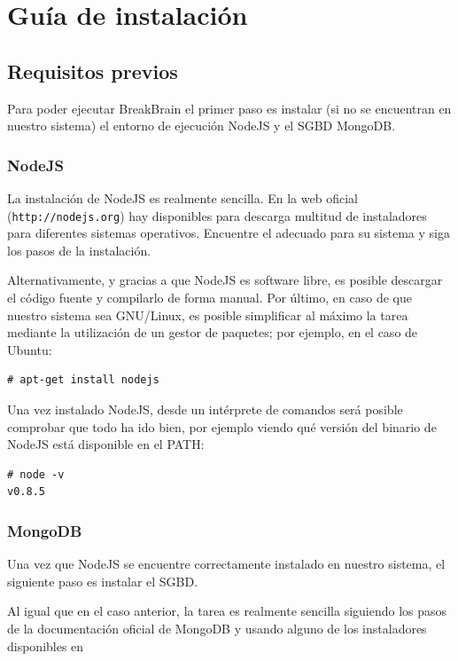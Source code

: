 \chapter{Guía de instalación}
\label{chap::instalacion}

\section{Requisitos previos}

Para poder ejecutar BreakBrain el primer paso es instalar (si no se encuentran en nuestro sistema) el entorno de ejecución NodeJS y el \acf{SGBD} MongoDB.

\subsection{NodeJS}

La instalación de NodeJS es realmente sencilla. En la web oficial ({\tt http://nodejs.org}) hay disponibles para descarga multitud de instaladores para diferentes sistemas operativos. Encuentre el adecuado para su sistema y siga los pasos de la instalación.

Alternativamente, y gracias a que NodeJS es software libre, es posible descargar el código fuente y compilarlo de forma manual. Por último, en caso de que nuestro sistema sea GNU/Linux, es posible simplificar al máximo la tarea mediante la utilización de un gestor de paquetes; por ejemplo, en el caso de Ubuntu:

\begin{verbatim}
# apt-get install nodejs  
\end{verbatim}

Una vez instalado NodeJS, desde un intérprete de comandos será posible comprobar que todo ha ido bien, por ejemplo viendo qué versión del binario de NodeJS está disponible en el PATH:

\begin{verbatim}
# node -v
v0.8.5
\end{verbatim}

\subsection{MongoDB}

Una vez que NodeJS se encuentre correctamente instalado en nuestro sistema, el siguiente paso es instalar el \acs{SGBD}.

Al igual que en el caso anterior, la tarea es realmente sencilla siguiendo los pasos de la documentación oficial de MongoDB y usando alguno de los instaladores disponibles en

